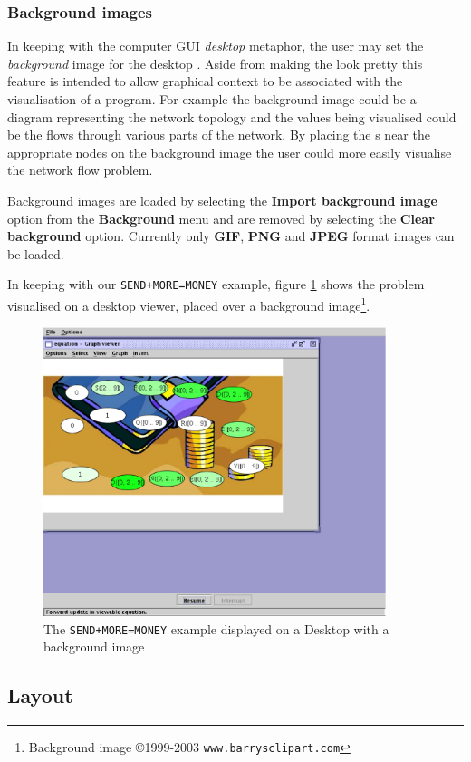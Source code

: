 \subsubsection{Background images}
In keeping with the computer GUI \emph{desktop} metaphor, the user may
set the \emph{background} image for the desktop \viewer{}.  Aside from
making the \viewer{} look pretty this feature is intended to allow
graphical context to be associated with the visualisation of a program.
For example the background image could be a diagram representing the
network topology and the values being visualised could be the flows
through various parts of the network.  By placing the \viewlet{}s near
the appropriate nodes on the background image the user could more
easily visualise the network flow problem.

Background images are loaded by selecting the \textbf{Import
background image} option from the \textbf{Background} menu and are
removed by selecting the \textbf{Clear background} option.  Currently
only \textbf{GIF}, \textbf{PNG} and \textbf{JPEG} format images can be
loaded.

In keeping with our \texttt{SEND+MORE=MONEY} example, figure
\ref{fig:sendmoremoney} shows the problem visualised on a desktop
viewer, placed over a background image\footnote{Background image
\copyright 1999-2003 \texttt{www.barrysclipart.com}}.


\begin{figure}[htp]
\centering
\includegraphics[width=10cm]{vcsendmoremoney}
\caption{The \texttt{SEND+MORE=MONEY} example displayed on a Desktop
\viewer{} with a background image}
\label{fig:sendmoremoney}
\end{figure}

\subsection{Layout}

